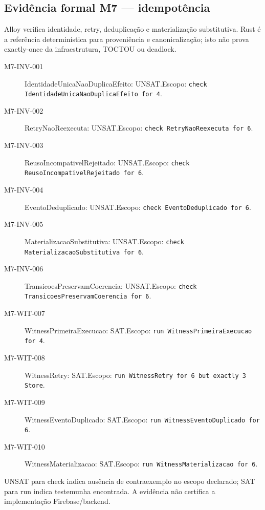 \subsection*{Evidência formal M7 --- idempotência}
Alloy verifica identidade, retry, deduplicação e materialização substitutiva. Rust é a referência determinística para proveniência e canonicalização; isto não prova exactly-once da infraestrutura, TOCTOU ou deadlock.
\begin{description}
\item[M7-INV-001] IdentidadeUnicaNaoDuplicaEfeito: UNSAT.\newline Escopo: \texttt{check IdentidadeUnicaNaoDuplicaEfeito for 4}.
\item[M7-INV-002] RetryNaoReexecuta: UNSAT.\newline Escopo: \texttt{check RetryNaoReexecuta for 6}.
\item[M7-INV-003] ReusoIncompativelRejeitado: UNSAT.\newline Escopo: \texttt{check ReusoIncompativelRejeitado for 6}.
\item[M7-INV-004] EventoDeduplicado: UNSAT.\newline Escopo: \texttt{check EventoDeduplicado for 6}.
\item[M7-INV-005] MaterializacaoSubstitutiva: UNSAT.\newline Escopo: \texttt{check MaterializacaoSubstitutiva for 6}.
\item[M7-INV-006] TransicoesPreservamCoerencia: UNSAT.\newline Escopo: \texttt{check TransicoesPreservamCoerencia for 6}.
\item[M7-WIT-007] WitnessPrimeiraExecucao: SAT.\newline Escopo: \texttt{run WitnessPrimeiraExecucao for 4}.
\item[M7-WIT-008] WitnessRetry: SAT.\newline Escopo: \texttt{run WitnessRetry for 6 but exactly 3 Store}.
\item[M7-WIT-009] WitnessEventoDuplicado: SAT.\newline Escopo: \texttt{run WitnessEventoDuplicado for 6}.
\item[M7-WIT-010] WitnessMaterializacao: SAT.\newline Escopo: \texttt{run WitnessMaterializacao for 6}.
\end{description}
UNSAT para check indica ausência de contraexemplo no escopo declarado; SAT para run indica testemunha encontrada. A evidência não certifica a implementação Firebase/backend.
